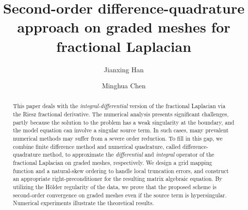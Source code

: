 \documentclass{amsart}
\theoremstyle{definition}
\theoremstyle{remark}
\numberwithin{equation}{section}
\begin{document}
\title{Second-order  difference-quadrature approach    on graded meshes  for fractional Laplacian }

  
\author{Jianxing Han}
\address{School of Mathematics and Statistics, Gansu Key Laboratory of Applied Mathematics and Complex Systems, Lanzhou University, Lanzhou 730000, P.R. China}



\author{Minghua Chen}
\address{School of Mathematics and Statistics, Gansu Key Laboratory of Applied Mathematics and Complex Systems, Lanzhou University, Lanzhou 730000, P.R. China }
  






%


\begin{abstract}
This paper deals with the {\em integral-differential} version of the   fractional Laplacian   via the Riesz fractional derivative. The numerical analysis presents significant challenges,  partly because the solution to the problem has a weak singularity at the boundary, and the model equation  can involve a singular  source term. In such cases, many prevalent numerical methods may suffer from a severe order reduction. To fill in this gap, we combine  finite difference method and  numerical quadrature, called  difference-quadrature method,    to approximate  the  {\em differential} and    {\em integral}   operator of  the   fractional Laplacian  on graded meshes, respectively. We  design a grid mapping function and a natural-skew  ordering  to handle  local truncation errors, and construct an appropriate  right-preconditioner for the resulting matrix algebraic equation. By utilizing the H\"older regularity of the data, we prove that the proposed scheme  is  second-order convergence on graded meshes even if the source term is hypersingular. Numerical experiments illustrate the theoretical results.
\end{abstract}
\end{document}
